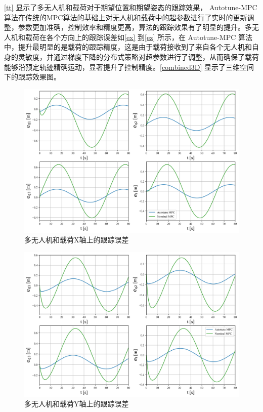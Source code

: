 \documentclass[lang=chs, degree=master, blindreview=false, winfonts=true]{yanputhesis}
\begin{document}
\autoref{tt} 显示了多无人机和载荷对于期望位置和期望姿态的跟踪效果， Autotune-MPC  算法在传统的MPC算法的基础上对无人机和载荷中的超参数进行了实时的更新调整，参数更加准确，控制效率和精度更高，算法的跟踪效果有了明显的提升。多无人机和载荷在各个方向上的跟踪误差如\autoref{ex} 到\autoref{ez} 所示，在 Autotune-MPC 算法中，提升最明显的是载荷的跟踪精度，这是由于载荷接收到了来自各个无人机和自身的灵敏度，并通过梯度下降的分布式策略对超参数进行了调整，从而确保了载荷能够沿预定轨迹精确运动，显著提升了控制精度。\autoref{combined3D} 显示了三维空间下的跟踪效果图。



\begin{figure}[H]
	\centering
	\includegraphics[width=38pc]{picture/kk2/ex.png} 
	\caption{多无人机和载荷X轴上的跟踪误差} 
	\label{ex}
\end{figure}

\begin{figure}[H]
	\centering
	\includegraphics[width=38pc]{picture/kk2/ey.png} 
	\caption{多无人机和载荷Y轴上的跟踪误差} 
	\label{ey}
\end{figure}
\end{document}
